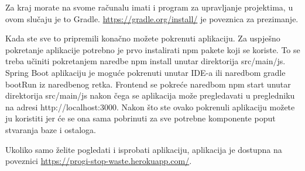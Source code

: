 		Za kraj morate na svome računalu imati i program za upravljanje projektima, u ovom slučaju je to Gradle. \url{https://gradle.org/install/} je poveznica za prezimanje.
		
		Kada ste sve to pripremili konačno možete pokrenuti aplikaciju. Za uspješno pokretanje aplikacije potrebno je prvo instalirati npm pakete koji se koriste. To se treba učiniti pokretanjem naredbe
		npm install unutar direktorija src/main/js.
		Spring Boot aplikaciju je moguće pokrenuti unutar IDE-a ili naredbom gradle bootRun iz naredbenog retka.
		Frontend se pokreće naredbom npm start unutar direktorija src/main/js nakon čega se aplikacija može pregledavati u pregledniku na adresi http://localhost:3000.
		Nakon što ste ovako pokrenuli aplikaciju možete ju koristiti jer će se ona sama pobrinuti za sve potrebne komponente poput stvaranja baze i ostaloga.
		
		Ukoliko samo želite pogledati i isprobati aplikaciju, aplikacija je dostupna na poveznici  \url{https://progi-stop-waste.herokuapp.com/}.
		
		
		
		
			 
			
			\eject 